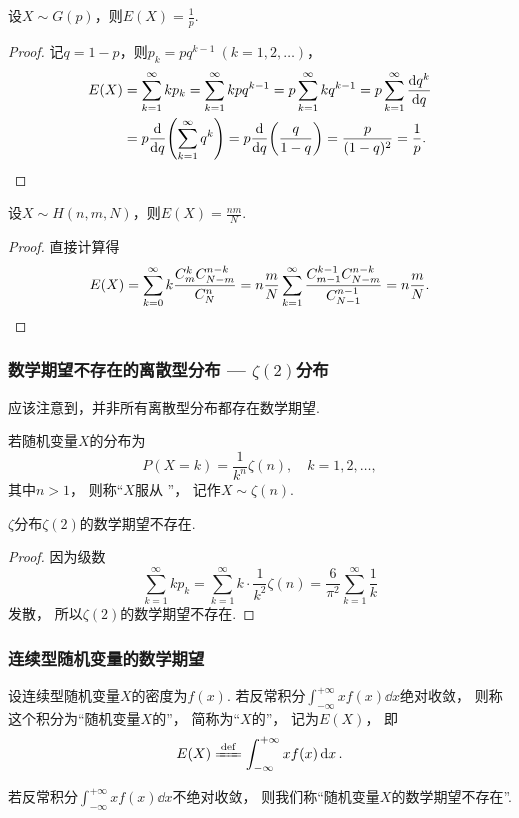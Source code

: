 \begin{theorem}\label{theorem:随机变量的数字特征.几何分布的数学期望}
设\(X \sim G(p)\)，则\(E(X) = \frac{1}{p}\).
\begin{proof}
记\(q = 1-p\)，则\(p_k = pq^{k-1}\ (k=1,2,\dotsc)\)，
\begin{align*}
	E(X)
	&= \sum_{k=1}^\infty k p_k
	= \sum_{k=1}^\infty k p q^{k-1}
	= p \sum_{k=1}^\infty k q^{k-1}
	= p \sum_{k=1}^\infty \dv{q^k}{q} \\
	&= p \dv{q}(\sum_{k=1}^\infty q^k)
	= p \dv{q}(\frac{q}{1-q})
	= \frac{p}{(1-q)^2}
	= \frac{1}{p}.
	\qedhere
\end{align*}
\end{proof}
\end{theorem}

\begin{theorem}
设\(X \sim H(n,m,N)\)，则\(E(X) = \frac{n m}{N}\).
\begin{proof}
直接计算得\[
	E(X)
	= \sum_{k=0}^\infty
		k \frac{C_m^k C_{N-m}^{n-k}}{C_N^n}
	= n \frac{m}{N}
		\sum_{k=1}^\infty
			\frac{C_{m-1}^{k-1} C_{N-m}^{n-k}}{C_{N-1}^{n-1}}
	= n \frac{m}{N}.
	\qedhere
\]
\end{proof}
\end{theorem}

\subsubsection{数学期望不存在的离散型分布 --- \texorpdfstring{\(\zeta(2)\)}{\textzeta(2)}分布}
应该注意到，并非所有离散型分布都存在数学期望.

\begin{definition}
若随机变量\(X\)的分布为\[
	P(X=k) = \frac{1}{k^n} \zeta(n),
	\quad k=1,2,\dotsc,
\]
其中\(n>1\)，
则称“\(X\)服从 ”，
记作\(X \sim \zeta(n)\).
\end{definition}

\begin{proposition}
\(\zeta\)分布\(\zeta(2)\)的数学期望不存在.
\begin{proof}
因为级数\[
	\sum_{k=1}^\infty k p_k
	= \sum_{k=1}^\infty k \cdot \frac{1}{k^2} \zeta(n)
	= \frac{6}{\pi^2} \sum_{k=1}^\infty \frac1k
\]发散，
所以\(\zeta(2)\)的数学期望不存在.
\end{proof}
\end{proposition}

\subsubsection{连续型随机变量的数学期望}
\begin{definition}
设连续型随机变量\(X\)的密度为\(f(x)\).
若反常积分\(\int_{-\infty}^{+\infty} x f(x) \dd{x}\)绝对收敛，
则称这个积分为“随机变量\(X\)的”，
简称为“\(X\)的”，
记为\(E(X)\)，
即\begin{equation}
	E(X) \defeq \int_{-\infty}^{+\infty} x f(x) \dd{x}.
\end{equation}

若反常积分\(\int_{-\infty}^{+\infty} x f(x) \dd{x}\)不绝对收敛，
则我们称“随机变量\(X\)的数学期望不存在”.
\end{definition}

